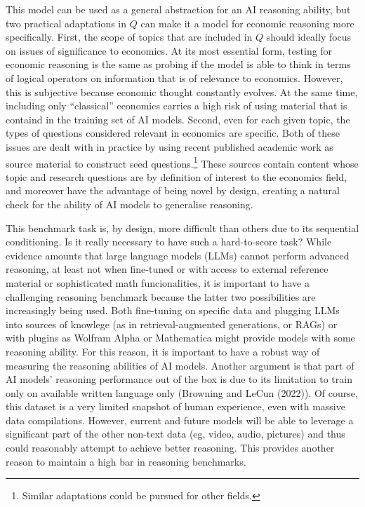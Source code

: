 \documentclass[
]{article}
\begin{document}
This model can be used as a general abstraction for an AI reasoning
ability, but two practical adaptations in \(Q\) can make it a model for
economic reasoning more specifically. First, the scope of topics that
are included in \(Q\) should ideally focus on issues of significance to
economics. At its most essential form, testing for economic reasoning is
the same as probing if the model is able to think in terms of logical
operators on information that is of relevance to economics. However,
this is subjective because economic thought constantly evolves. At the
same time, including only ``classical'' economics carries a high risk of
using material that is containd in the training set of AI models.
Second, even for each given topic, the types of questions considered
relevant in economics are specific. Both of these issues are dealt with
in practice by using recent published academic work as source material
to construct seed questions.\footnote{Similar adaptations could be
  pursued for other fields.} These sources contain content whose topic
and research questions are by definition of interest to the economics
field, and moreover have the advantage of being novel by design,
creating a natural check for the ability of AI models to generalise
reasoning.

This benchmark task is, by design, more difficult than others due to its
sequential conditioning. Is it really necessary to have such a
hard-to-score task? While evidence amounts that large language models
(LLMs) cannot perform advanced reasoning, at least not when fine-tuned
or with access to external reference material or sophisticated math
funcionalities, it is important to have a challenging reasoning
benchmark because the latter two possibilities are increasingly being
used. Both fine-tuning on specific data and plugging LLMs into sources
of knowlege (as in retrieval-augmented generations, or RAGs) or with
plugins as Wolfram Alpha or Mathematica might provide models with some
reasoning ability. For this reason, it is important to have a robust way
of measuring the reasoning abilities of AI models. Another argument is
that part of AI models' reasoning performance out of the box is due to
its limitation to train only on available written language only
(Browning and LeCun (2022)). Of course, this dataset is a very limited
snapshot of human experience, even with massive data compilations.
However, current and future models will be able to leverage a
significant part of the other non-text data (eg, video, audio, pictures)
and thus could reasonably attempt to achieve better reasoning. This
provides another reason to maintain a high bar in reasoning benchmarks.
\end{document}
